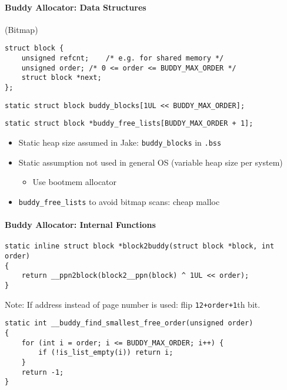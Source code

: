 \paragraph{Buddy Allocator: Data Structures}
 (Bitmap)
\begin{lstlisting}[style=bright_C++]
struct block {
    unsigned refcnt;    /* e.g. for shared memory */
    unsigned order; /* 0 <= order <= BUDDY_MAX_ORDER */
    struct block *next;
};
\end{lstlisting}
\newpar{}
\begin{lstlisting}[style=bright_C++]
static struct block buddy_blocks[1UL << BUDDY_MAX_ORDER];
\end{lstlisting}

\begin{lstlisting}[style=bright_C++]
static struct block *buddy_free_lists[BUDDY_MAX_ORDER + 1];
\end{lstlisting}

\newpar{}
\begin{itemize}
    \item Static heap size assumed in Jake: \texttt{buddy\_blocks} in \texttt{.bss}
    \item Static assumption not used in general OS (variable heap size per system)
          \begin{itemize}
              \item Use bootmem allocator
          \end{itemize}
    \item \texttt{buddy\_free\_lists} to avoid bitmap scans: cheap malloc
\end{itemize}

\paragraph{Buddy Allocator: Internal Functions}
\begin{lstlisting}[style=bright_C++]
static inline struct block *block2buddy(struct block *block, int order)
{
    return __ppn2block(block2__ppn(block) ^ 1UL << order);
}
\end{lstlisting}
Note: If address instead of page number is used: flip \texttt{12+order+1}th bit.

\newpar{}
\begin{lstlisting}[style=bright_C++]
static int __buddy_find_smallest_free_order(unsigned order)
{
    for (int i = order; i <= BUDDY_MAX_ORDER; i++) {
        if (!is_list_empty(i)) return i;
    }
    return -1;
}
\end{lstlisting}

